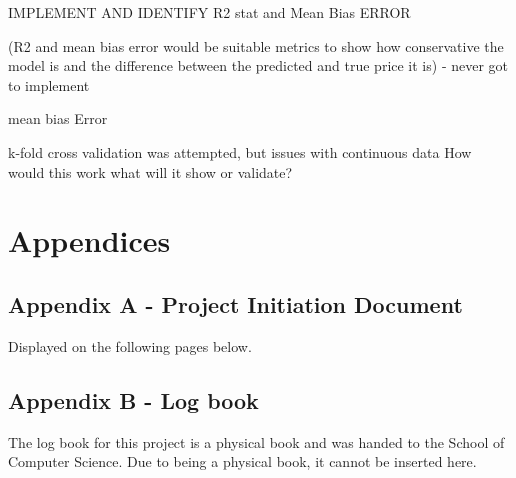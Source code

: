 \documentclass[oneside, 12pt]{article}
\begin{document}
		IMPLEMENT AND IDENTIFY R2 stat and Mean Bias ERROR
		
		(R2 and mean bias error would be suitable metrics to show how conservative the model is and the difference between the predicted and true price it is) - never got to implement
		
		mean bias Error
		
		k-fold cross validation was attempted, but issues with continuous data
		How would this work what will it show or validate?
	\newpage
	
	\nocite{*}
	\printbibliography
	
	\newpage
	\section{Appendices}
		\subsection{Appendix A - Project Initiation Document}
		Displayed on the following pages below.
		
		
		\subsection{Appendix B - Log book}
		The log book for this project is a physical book and was handed to the School of Computer Science. Due to being a physical book, it cannot be inserted here.
	
\end{document}
